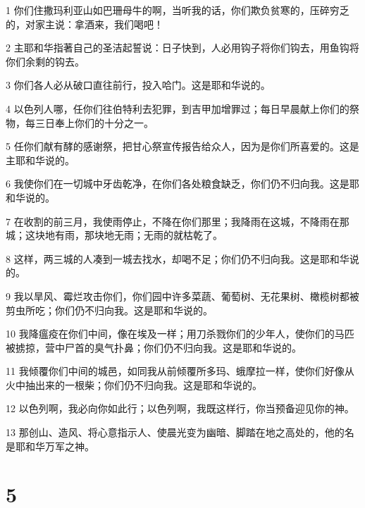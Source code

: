 \par 1 你们住撒玛利亚山如巴珊母牛的啊，当听我的话，你们欺负贫寒的，压碎穷乏的，对家主说：拿酒来，我们喝吧！
\par 2 主耶和华指著自己的圣洁起誓说：日子快到，人必用钩子将你们钩去，用鱼钩将你们余剩的钩去。
\par 3 你们各人必从破口直往前行，投入哈门。这是耶和华说的。
\par 4 以色列人哪，任你们往伯特利去犯罪，到吉甲加增罪过；每日早晨献上你们的祭物，每三日奉上你们的十分之一。
\par 5 任你们献有酵的感谢祭，把甘心祭宣传报告给众人，因为是你们所喜爱的。这是主耶和华说的。
\par 6 我使你们在一切城中牙齿乾净，在你们各处粮食缺乏，你们仍不归向我。这是耶和华说的。
\par 7 在收割的前三月，我使雨停止，不降在你们那里；我降雨在这城，不降雨在那城；这块地有雨，那块地无雨；无雨的就枯乾了。
\par 8 这样，两三城的人凑到一城去找水，却喝不足；你们仍不归向我。这是耶和华说的。
\par 9 我以旱风、霉烂攻击你们，你们园中许多菜蔬、葡萄树、无花果树、橄榄树都被剪虫所吃；你们仍不归向我。这是耶和华说的。
\par 10 我降瘟疫在你们中间，像在埃及一样；用刀杀戮你们的少年人，使你们的马匹被掳掠，营中尸首的臭气扑鼻；你们仍不归向我。这是耶和华说的。
\par 11 我倾覆你们中间的城邑，如同我从前倾覆所多玛、蛾摩拉一样，使你们好像从火中抽出来的一根柴；你们仍不归向我。这是耶和华说的。
\par 12 以色列啊，我必向你如此行；以色列啊，我既这样行，你当预备迎见你的神。
\par 13 那创山、造风、将心意指示人、使晨光变为幽暗、脚踏在地之高处的，他的名是耶和华万军之神。

\chapter{5}

